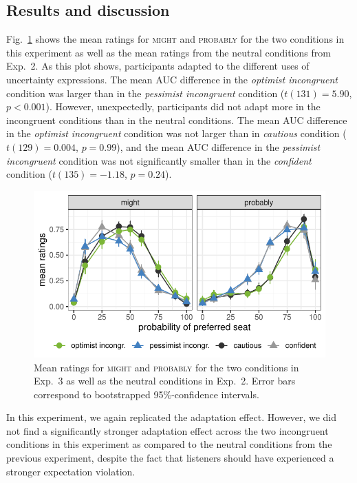 \subsection{Results and discussion}

Fig.~\ref{fig:results-exp3} shows the mean ratings for \textsc{might} and \textsc{probably} for the two conditions in this experiment as well as the mean ratings from the neutral conditions from Exp.~2. As this plot shows, participants adapted to the different uses of uncertainty expressions. The mean AUC difference in the \textit{optimist incongruent} condition was larger than in the \textit{pessimist incongruent} condition ($t(131)=5.90$, $p<0.001$). However, unexpectedly, participants did not adapt more in the incongruent conditions than in the neutral conditions. The mean AUC difference in the \textit{optimist incongruent} condition was not larger than in \textit{cautious} condition ($t(129)=0.004$, $p=0.99$), and the mean AUC difference in the \textit{pessimist incongruent} condition was not significantly smaller than in the \textit{confident} condition ($t(135)=-1.18$, $p=0.24$).

\begin{figure}[t]
    \centering
    \includegraphics[width=\columnwidth, trim={0 0.75cm 0 0cm}]{./plots/incongruent.pdf}
    \caption{Mean ratings for \textsc{might} and \textsc{probably} for the two conditions in Exp.~3 as well as the neutral conditions in Exp.~2. Error bars correspond to bootstrapped 95\%-confidence intervals.}
    \label{fig:results-exp3}
\end{figure}

In this experiment, we again replicated the adaptation effect. However, we did not find a significantly stronger adaptation effect across the two incongruent conditions in this experiment as compared to the neutral conditions from the previous experiment, despite the fact that listeners should have experienced a stronger expectation violation.

